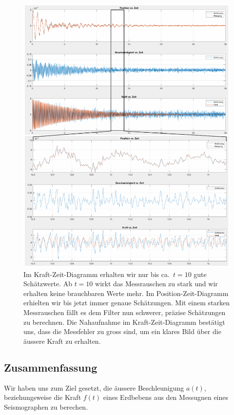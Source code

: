 \begin{figure}
  \begin{center}
    \includegraphics[width=.95\linewidth,keepaspectratio]{papers/erdbeben/images/Messrauschen_geaendert.PDF}
    \caption{
      Im Kraft-Zeit-Diagramm erhalten wir nur bis ca.\ $t = 10$ gute Schätzwerte.
      Ab $t = 10$ wirkt das Messrauschen zu stark und wir erhalten keine brauchbaren Werte mehr.
      Im Position-Zeit-Diagramm erhielten wir bis jetzt immer genaue Schätzungen.
      Mit einem starken Messrauschen fällt es dem Filter nun schwerer,
      präzise Schätzungen zu berechnen.
      Die Nahaufnahme im Kraft-Zeit-Diagramm bestätigt uns,
      dass die Messfehler zu gross sind,
      um ein klares Bild über die äussere Kraft zu erhalten.
    }
   \label{erdbeben:fig:messrauschen-geaendert}
  \end{center}
\end{figure}

\subsection{Zusammenfassung}
Wir haben uns zum Ziel gesetzt,
die äussere Beschleunigung $a(t)$,
beziehungsweise die Kraft $f(t)$ eines Erdbebens
aus den Messugnen eines Seismographen zu berechen.

